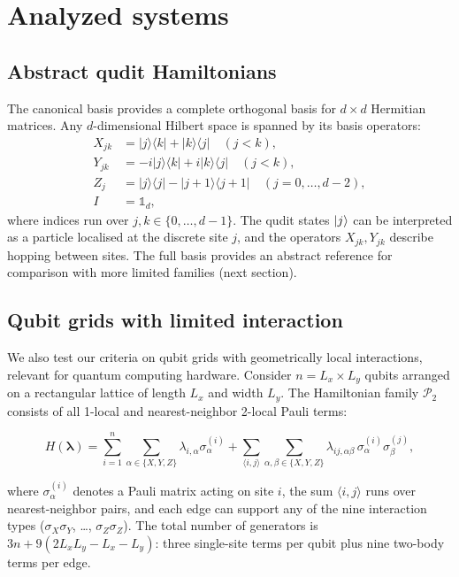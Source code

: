 \documentclass[aps,prx,reprint,superscriptaddress,footnote, twocolumn,notitlepage]{revtex4-2}
\begin{document}
\section{Analyzed systems}\label{sec:systems}
\subsection{Abstract qudit Hamiltonians}
\label{sec:canonical}

The canonical basis provides a complete orthogonal basis for $d\times d$ Hermitian matrices. Any $d$-dimensional Hilbert space is spanned by its basis operators:
\begin{equation}
\begin{aligned}
X_{jk} &= |j\rangle\langle k| + |k\rangle\langle j| \quad (j < k), \\
Y_{jk} &= -i|j\rangle\langle k| + i|k\rangle\langle j| \quad (j < k), \\
Z_j &= |j\rangle\langle j| - |j+1\rangle\langle j+1| \quad (j = 0, \ldots, d-2), \\
I &= \mathbb{1}_d,
\end{aligned}
\label{eq:canonical_basis}
\end{equation}
where indices run over $j, k \in \{0, \ldots, d-1\}$. %
The qudit states $\ket{j}$ can be interpreted as a particle localised at the discrete site $j$, and the operators $X_{jk}, Y_{jk}$ describe hopping between sites. The full basis provides an abstract reference for comparison with more limited families (next section).

\subsection{Qubit grids with limited interaction} \label{sec:geo2}

We also test our criteria on qubit grids with geometrically local interactions, relevant for quantum computing hardware. Consider $n = L_x \times L_y$ qubits arranged on a rectangular lattice of length $L_x$ and width $L_y$. The Hamiltonian family $\mathcal{P}_2$ consists of all 1-local and nearest-neighbor 2-local Pauli terms:

\begin{widetext}
\begin{equation}
H(\boldsymbol{\lambda}) = \sum_{i=1}^{n} \sum_{\alpha \in \{X,Y,Z\}} \lambda_{i,\alpha} \sigma_\alpha^{(i)} + \sum_{\langle i,j \rangle} \sum_{\alpha,\beta \in \{X,Y,Z\}} \lambda_{ij,\alpha\beta} \, \sigma_\alpha^{(i)} \sigma_\beta^{(j)},
\label{eq:geo2local}
\end{equation}
\end{widetext}
where $\sigma_\alpha^{(i)}$ denotes a Pauli matrix acting on site $i$, the sum $\langle i,j \rangle$ runs over nearest-neighbor pairs, and each edge can support any of the nine interaction types ($\sigma_X \sigma_Y$, \ldots, $\sigma_Z \sigma_Z$). The total number of generators is $3n + 9(2L_x L_y - L_x - L_y)$: three single-site terms per qubit plus nine two-body terms per edge.
\end{document}
